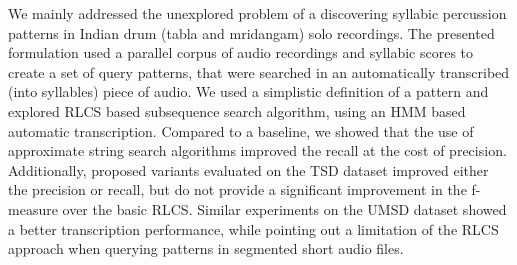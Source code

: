 We mainly addressed the unexplored problem of a discovering syllabic percussion patterns in Indian drum (\gls{tabla} and mridangam) solo recordings. The presented formulation used a parallel corpus of audio recordings and syllabic scores to create a set of query patterns, that were searched in an automatically transcribed (into syllables) piece of audio. We used a simplistic definition of a pattern and explored \gls{RLCS} based subsequence search algorithm, using an \gls{HMM} based automatic transcription. Compared to a baseline, we showed that the use of approximate string search algorithms improved the recall at the cost of precision. Additionally, proposed variants evaluated on the \acrshort{TSD} dataset improved either the precision or recall, but do not provide a significant improvement in the f-measure over the basic \gls{RLCS}. Similar experiments on the \acrshort{UMSD} dataset showed a better transcription performance, while pointing out a limitation of the \gls{RLCS} approach when querying patterns in segmented short audio files. 

